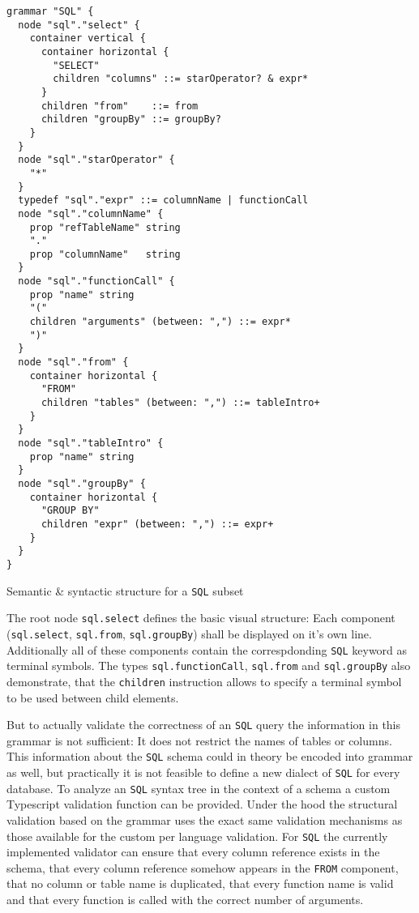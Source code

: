 \documentclass[sigconf,natbib=false,review=true,anonymous]{acmart}
\newenvironment{longlisting}{\captionsetup{type=listing} \vspace{1.5em}}{\vspace{1.5em}}
\begin{document}
\begin{longlisting}
\begin{verbatim}
grammar "SQL" {
  node "sql"."select" {
    container vertical {
      container horizontal {
        "SELECT"
        children "columns" ::= starOperator? & expr*
      }
      children "from"    ::= from
      children "groupBy" ::= groupBy?
    }
  }
  node "sql"."starOperator" {
    "*"
  }
  typedef "sql"."expr" ::= columnName | functionCall
  node "sql"."columnName" {
    prop "refTableName" string
    "."
    prop "columnName"   string
  }
  node "sql"."functionCall" {
    prop "name" string
    "("
    children "arguments" (between: ",") ::= expr*
    ")"
  }
  node "sql"."from" {
    container horizontal {
      "FROM"
      children "tables" (between: ",") ::= tableIntro+
    }
  }
  node "sql"."tableIntro" {
    prop "name" string
  }
  node "sql"."groupBy" {
    container horizontal {
      "GROUP BY"
      children "expr" (between: ",") ::= expr+
    }
  }
}
\end{verbatim}
\caption{Semantic \& syntactic structure for a \texttt{SQL} subset}
\label{lst:grammar-sql}
\end{longlisting}

The root node \texttt{sql.select} defines the basic visual structure: Each component (\texttt{sql.select}, \texttt{sql.from}, \texttt{sql.groupBy}) shall be displayed on it's own line. Additionally all of these components contain the correspdonding \texttt{SQL} keyword as terminal symbols. The types \texttt{sql.functionCall}, \texttt{sql.from} and \texttt{sql.groupBy} also demonstrate, that the \texttt{children} instruction allows to specify a terminal symbol to be used between child elements.

But to actually validate the correctness of an \texttt{SQL} query the information in this grammar is not sufficient: It does not restrict the names of tables or columns. This information about the \texttt{SQL} schema could in theory be encoded into grammar as well, but practically it is not feasible to define a new dialect of \texttt{SQL} for every database. To analyze an \texttt{SQL} syntax tree in the context of a schema a custom Typescript validation function can be provided. Under the hood the structural validation based on the grammar uses the exact same validation mechanisms as those available for the custom per language validation. For \texttt{SQL} the currently implemented validator can ensure that every column reference exists in the schema, that every column reference somehow appears in the \texttt{FROM} component, that no column or table name is duplicated, that every function name is valid and that every function is called with the correct number of arguments.
\end{document}
